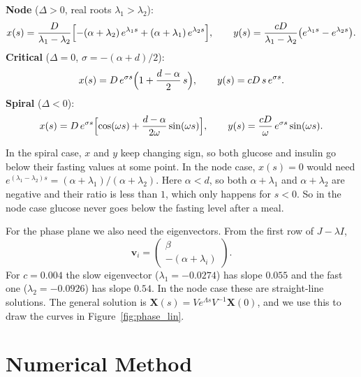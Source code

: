 \documentclass[11pt,a4paper]{article}
\begin{document}
\noindent\textbf{Node} ($\Delta>0$, real roots $\lambda_1>\lambda_2$):
\begin{equation}\label{eq:sol_node}
x(s)=\frac{D}{\lambda_1-\lambda_2}\Bigl[-(\alpha+\lambda_2)\,e^{\lambda_1 s}+(\alpha+\lambda_1)\,e^{\lambda_2 s}\Bigr],\qquad
y(s)=\frac{cD}{\lambda_1-\lambda_2}\bigl(e^{\lambda_1 s}-e^{\lambda_2 s}\bigr).
\end{equation}
\textbf{Critical} ($\Delta=0$, $\sigma=-(\alpha+d)/2$):
\begin{equation}\label{eq:sol_crit}
x(s)=D\,e^{\sigma s}\Bigl(1+\frac{d-\alpha}{2}\,s\Bigr),\qquad
y(s)=cD\,s\,e^{\sigma s}.
\end{equation}
\textbf{Spiral} ($\Delta<0$):
\begin{equation}\label{eq:sol_spiral}
x(s)=D\,e^{\sigma s}\Bigl[\cos(\omega s)+\frac{d-\alpha}{2\omega}\sin(\omega s)\Bigr],\qquad
y(s)=\frac{cD}{\omega}\,e^{\sigma s}\sin(\omega s).
\end{equation}

In the spiral case, $x$ and $y$ keep changing sign, so both glucose and insulin go below their fasting values at some point. In the node case, $x(s)=0$ would need $e^{(\lambda_1-\lambda_2)s}=(\alpha+\lambda_1)/(\alpha+\lambda_2)$. Here $\alpha<d$, so both $\alpha+\lambda_1$ and $\alpha+\lambda_2$ are negative and their ratio is less than $1$, which only happens for $s<0$. So in the node case glucose never goes below the fasting level after a meal.

For the phase plane we also need the eigenvectors. From the first row of $J-\lambda I$,
\begin{equation}\label{eq:eigvec}
\mathbf{v}_i=\begin{pmatrix}\beta\\ -(\alpha+\lambda_i)\end{pmatrix}.
\end{equation}
For $c=0.004$ the slow eigenvector ($\lambda_1=-0.0274$) has slope $0.055$ and the fast one ($\lambda_2=-0.0926$) has slope $0.54$. In the node case these are straight-line solutions. The general solution is $\mathbf{X}(s)=Ve^{\Lambda s}V^{-1}\mathbf{X}(0)$, and we use this to draw the curves in Figure~\ref{fig:phase_lin}.

\section{Numerical Method}\label{sec:numerics}
\end{document}
